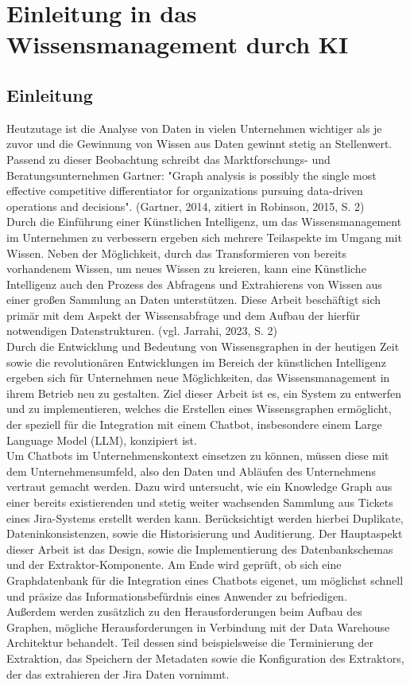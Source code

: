 \section{Einleitung in das Wissensmanagement durch KI}
\subsection{Einleitung}
Heutzutage ist die Analyse von Daten in vielen Unternehmen wichtiger als je zuvor und die Gewinnung von Wissen aus Daten gewinnt stetig an Stellenwert. Passend zu dieser Beobachtung schreibt das Marktforschungs- und Beratungsunternehmen Gartner: "Graph analysis is possibly the single most effective competitive differentiator for organizations pursuing data-driven operations and decisions". (Gartner, 2014, zitiert in Robinson, 2015, S. 2) \\
Durch die Einführung einer Künstlichen Intelligenz, um das Wissensmanagement im Unternehmen zu verbessern ergeben sich mehrere Teilaspekte im Umgang mit Wissen. Neben der Möglichkeit, durch das Transformieren von bereits vorhandenem Wissen, um neues Wissen zu kreieren, kann eine Künstliche Intelligenz auch den Prozess des Abfragens und Extrahierens von Wissen aus einer großen Sammlung an Daten unterstützen. Diese Arbeit beschäftigt sich primär mit dem Aspekt der Wissensabfrage und dem Aufbau der hierfür notwendigen Datenstrukturen. (vgl. Jarrahi, 2023, S. 2) \\
Durch die Entwicklung und Bedeutung von Wissensgraphen in der heutigen Zeit sowie die revolutionären Entwicklungen im Bereich der künstlichen Intelligenz ergeben sich für Unternehmen neue Möglichkeiten, das Wissensmanagement in ihrem Betrieb neu zu gestalten. Ziel dieser Arbeit ist es, ein System zu entwerfen und zu implementieren, welches die Erstellen eines Wissensgraphen ermöglicht, der speziell für die Integration mit einem Chatbot, insbesondere einem Large Language Model (LLM), konzipiert ist.\\
Um Chatbots im Unternehmenskontext einsetzen zu können, müssen diese mit dem Unternehmensumfeld, also den Daten und Abläufen des Unternehmens vertraut gemacht werden. Dazu wird untersucht, wie ein Knowledge Graph aus einer bereits existierenden und stetig weiter wachsenden Sammlung aus Tickets eines Jira-Systems erstellt werden kann. Berücksichtigt werden hierbei Duplikate, Dateninkonsistenzen, sowie die Historisierung und Auditierung. Der Hauptaspekt dieser Arbeit ist das Design, sowie die Implementierung des Datenbankschemas und der Extraktor-Komponente. Am Ende wird geprüft, ob sich eine Graphdatenbank für die Integration eines Chatbots eigenet, um möglichst schnell und präsize das Informationsbefürdnis eines Anwender zu befriedigen.\\
Außerdem werden zusätzlich zu den Herausforderungen beim Aufbau des Graphen, mögliche Herausforderungen in Verbindung mit der Data Warehouse Architektur behandelt. Teil dessen sind beispielsweise die Terminierung der Extraktion, das Speichern der Metadaten sowie die Konfiguration des Extraktors, der das extrahieren der Jira Daten vornimmt. \\
